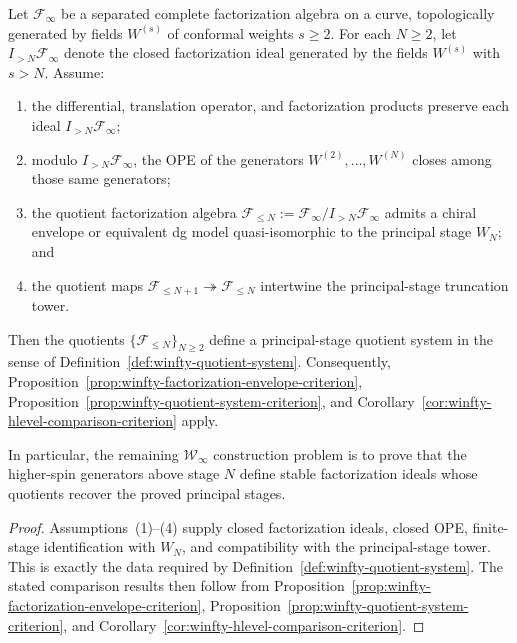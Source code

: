 \begin{proposition}
\label{prop:winfty-higher-spin-ideal-criterion}
Let $\mathcal{F}_\infty$ be a separated complete factorization algebra
on a curve, topologically generated by fields
$W^{(s)}$ of conformal weights $s \ge 2$. For each $N \ge 2$, let
$I_{>N}\mathcal{F}_\infty$ denote the closed factorization ideal
generated by the fields $W^{(s)}$ with $s > N$. Assume:
\begin{enumerate}
\item the differential, translation operator, and factorization
 products preserve each ideal $I_{>N}\mathcal{F}_\infty$;
\item modulo $I_{>N}\mathcal{F}_\infty$, the OPE of the generators
 $W^{(2)},\dots,W^{(N)}$ closes among those same generators;
\item the quotient factorization algebra
 $\mathcal{F}_{\le N}:=\mathcal{F}_\infty/I_{>N}\mathcal{F}_\infty$
 admits a chiral envelope or equivalent dg model quasi-isomorphic to
 the principal stage $W_N$; and
\item the quotient maps
 $\mathcal{F}_{\le N+1}\twoheadrightarrow \mathcal{F}_{\le N}$
 intertwine the principal-stage truncation tower.
\end{enumerate}
Then the quotients $\{\mathcal{F}_{\le N}\}_{N \ge 2}$ define a
principal-stage quotient system in the sense of
Definition~\ref{def:winfty-quotient-system}. Consequently,
Proposition~\ref{prop:winfty-factorization-envelope-criterion},
Proposition~\ref{prop:winfty-quotient-system-criterion}, and
Corollary~\ref{cor:winfty-hlevel-comparison-criterion} apply.

In particular, the remaining $\mathcal{W}_\infty$ construction problem
is to prove that the higher-spin generators above stage $N$ define
stable factorization ideals whose quotients recover the proved
principal stages.
\end{proposition}

\begin{proof}
Assumptions~\textup{(1)--(4)} supply closed factorization ideals, closed OPE, finite-stage identification with
$W_N$, and compatibility with the
principal-stage tower. This is exactly the data required by
Definition~\ref{def:winfty-quotient-system}. The stated comparison
results then follow from
Proposition~\ref{prop:winfty-factorization-envelope-criterion},
Proposition~\ref{prop:winfty-quotient-system-criterion}, and
Corollary~\ref{cor:winfty-hlevel-comparison-criterion}.
\end{proof}

